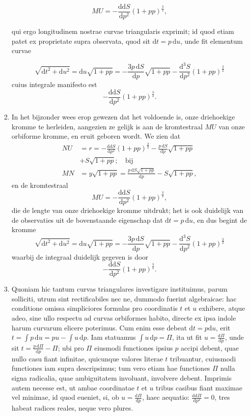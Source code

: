 \documentclass[10pt,a4paper]{article}
\newcommand{\switchenum}{\setcounter{enumi}{\arabic{enumi}-1}\switchcolumn}
\def\D{\mathrm{d}}
\begin{document}
\begin{paracol}{2}
\begin{enumerate}[topsep=1px]
		\[
			MU = -\frac{\D \D S}{\D p^2}(1+pp)^\frac{3}{2},
		\]
		\par qui ergo longitudinem nostrae curvae triangularis exprimit; id quod etiam patet ex proprietate supra observata, quod sit $\D t = p\, \D u$, unde fit elementum curvae
		
		\[
			\sqrt{\D t^2+\D u^2} = \D u\sqrt{1+pp} = -\frac{3p\, \D S}{\D p}\sqrt{1+pp}-\frac{\D^3S}{\D p^2}(1+pp)^\frac{3}{2}
		\]
		cuius integrale manifesto est
		\[
			-\frac{\D \D S}{\D p^2}(1+pp)^\frac{3}{2}.
		\]
		
		\switchenum
		\item In het bijzonder wees erop gewezen dat het voldoende is, onze driehoekige kromme te herleiden, aangezien ze gelijk is aan de kromtestraal $MU$ van onze orbiforme kromme, en eruit geboren wordt. We zien dat
		\begin{align*}
			NU &= r = -\frac{\D \D S}{\D p^2}(1+pp)^\frac{3}{2}-\frac{p\,\D S}{\D p}\sqrt{1+pp}\\
			& +S\sqrt{1+pp}; \quad \text{bij}\\
			MN & = y\sqrt{1+pp} = \frac{p\, \D S\sqrt{1+pp}}{\D p}-S\sqrt{1+pp},
		\end{align*}
		en de kromtestraal
		\[
			MU = -\frac{\D \D S}{\D p^2}(1+pp)^\frac{3}{2},
		\]
		die de lengte van onze driehoekige kromme uitdrukt; het is ook duidelijk van de observaties uit de bovenstaande eigenschap dat $\D t = p\, \D u$, en dus begint de kromme 
		\[
			\sqrt{\D t^2+\D u^2} = \D u\sqrt{1+pp} = -\frac{3p\, \D S}{\D p}\sqrt{1+pp}-\frac{\D^3S}{\D p^2}(1+pp)^\frac{3}{2}
		\]
		waarbij de integraal duidelijk gegeven is door
		\[
			-\frac{\D \D S}{\D p^2}(1+pp)^\frac{3}{2}.
		\]
		
		\switchcolumn*
		
		\item Quoniam hic tantum curvas triangulares investigare instituimus, parum solliciti, utrum sint rectificabiles nec ne, dummodo fuerint algebraicae: hac conditione omissa simpliciores formulas pro coordinatis $t$ et $u$ exhibere, atque adeo, sine ullo respectu ad curvas orbiformes habito, directe ex ipsa indole harum curvarum elicere poterimus. Cum enim esse debeat $\D t=p \D u$, erit $t=\int p\,\D u = pu-\int u \,\D p$. Iam statuamus $\int u \,\D p = \Pi$, ita ut fit $u=\frac{\D \Pi}{\D p}$, unde sit $t=\frac{p\,\D \Pi}{\D p}-\Pi$; ubi pro $\Pi$ eiusmodi functiones ipsius $p$ accipi debent, quae nullo casu fiant infinitae, quicunque valores literae $t$ tribuantur, cuiusmodi functiones iam supra descripsimus; tum vero etiam hae functiones $\Pi$ nulla signa radicalia, quae ambiguitatem involuant, involvere debent. Imprimis autem necesse est, ut ambae coordinatae $t$ et $u$ tribus casibus fiant maximae vel minimae, id quod eueniet, si, ob $u=\frac{\D \Pi}{\D p}$, haec aequatio: $\frac{\D\D \Pi}{\D p^2} = 0$, tres habeat radices reales, neque vero plures.


\end{enumerate}
\end{paracol}
\end{document}
